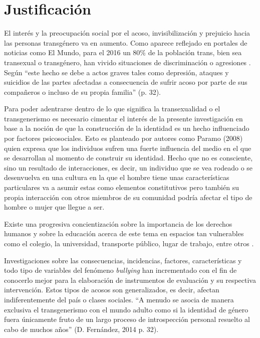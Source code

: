 \section{Justificación}

El interés y la preocupación social
por el acoso, invisibilización y prejuicio hacia las personas transgénero va en
aumento. Como aparece reflejado en portales de noticias como El Mundo, para
el 2016 un 80\% de la población trans, bien sea transexual o transgénero,
han vivido situaciones de discriminación o agresiones \parencite{Alpuente2016}.
Según \textcite{Fernandez2014} “este hecho se debe a actos graves tales como
depresión, ataques y suicidios de las partes afectadas a consecuencia de sufrir
acoso por parte de sus compañeros o incluso de su propia familia” (p. 32).

Para poder adentrarse dentro de lo que significa la transexualidad o el
transgenerismo es necesario cimentar el interés de la presente investigación en
base a la noción de que la construcción de la identidad es un hecho influenciado
por factores psicosociales. Esto es planteado por autores como Paramo (2008) quien
expresa que los individuos sufren una fuerte influencia del medio en el que se
desarrollan al momento de construir su identidad. Hecho que no es consciente,
sino un resultado de interacciones, es decir, un individuo que se vea rodeado o
se desenvuelva en una cultura en la que el hombre tiene unas características
particulares va a asumir estas como elementos constitutivos pero también su
propia interacción con otros miembros de su comunidad podría afectar el tipo de
hombre o mujer que llegue a ser.

Existe una progresiva concientización sobre la importancia de los derechos
humanos y sobre la educación acerca de este tema en espacios tan vulnerables
como el colegio, la universidad, transporte público, lugar de trabajo, entre
otros \parencite{Fernandez2014}.

Investigaciones sobre las consecuencias, incidencias, factores, características
y todo tipo de variables del fenómeno \emph{bullying} han incrementado con el
fin de conocerlo mejor para la elaboración de instrumentos de evaluación y su
respectiva intervención. Estos tipos de acosos son generalizados, es decir,
afectan indiferentemente del país o clases sociales. “A menudo se asocia de
manera exclusiva el transgenerismo con el mundo adulto como si la identidad de
género fuera únicamente fruto de un largo proceso de introspección personal
resuelto al cabo de muchos años” (D. Fernández, 2014 p. 32).

